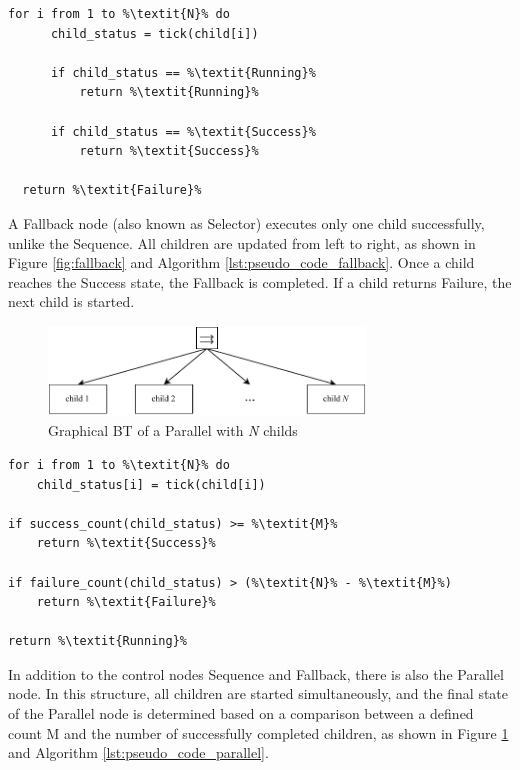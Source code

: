   \begin{lstlisting}[float=h]
  for i from 1 to %\textit{N}% do
      child_status = tick(child[i])
      
      if child_status == %\textit{Running}%
          return %\textit{Running}%
          
      if child_status == %\textit{Success}%
          return %\textit{Success}%
  
  return %\textit{Failure}%
  \end{lstlisting}

  A Fallback node (also known as Selector) executes only one child successfully, unlike the Sequence. All children are updated from left to right, as shown in Figure \ref{fig:fallback} and Algorithm \ref{lst:pseudo_code_fallback}. Once a child reaches the Success state, the Fallback is completed. If a child returns Failure, the next child is started.

\begin{figure}[h]
    \centering
    \includegraphics[width=0.75\textwidth]{figures/02_state_of_the_art/parallel.pdf}
    \caption{Graphical BT of a Parallel with \textit{N} childs}
    \label{fig:parallel}
\end{figure}
  
\begin{lstlisting}[float=h]
for i from 1 to %\textit{N}% do
    child_status[i] = tick(child[i])
    
if success_count(child_status) >= %\textit{M}%
    return %\textit{Success}%
        
if failure_count(child_status) > (%\textit{N}% - %\textit{M}%)
    return %\textit{Failure}%

return %\textit{Running}%
\end{lstlisting}

In addition to the control nodes Sequence and Fallback, there is also the Parallel node. In this structure, all children are started simultaneously, and the final state of the Parallel node is determined based on a comparison between a defined count M and the number of successfully completed children, as shown in Figure \ref{fig:parallel} and Algorithm \ref{lst:pseudo_code_parallel}.

